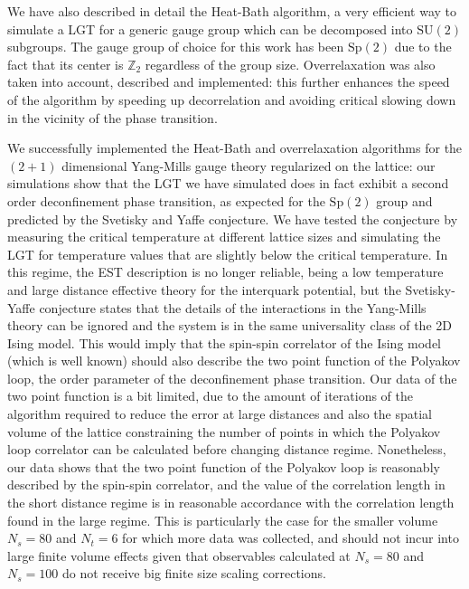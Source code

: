 \documentclass[reqno,12pt]{article}
\numberwithin{equation}{section}
\newcommand{\SU}{\mathrm{SU}}
\newcommand{\Sp}{\mathrm{Sp}}
\begin{document}
We have also described in detail the Heat-Bath algorithm, a very efficient way to simulate a LGT for a generic gauge
group which can be decomposed into $\SU(2)$ subgroups. The gauge group of choice for this work has been $\Sp(2)$ due to the 
fact that its center is $\mathbb{Z}_2$ regardless of the group size. Overrelaxation was also taken into account, described
and implemented: this further enhances the speed of the algorithm by speeding up decorrelation and avoiding critical 
slowing down in the vicinity of the phase transition. 

We successfully implemented the Heat-Bath and overrelaxation algorithms for the $(2+1)$ dimensional
Yang-Mills gauge theory regularized on the lattice: our simulations show that the LGT we have simulated
does in fact exhibit a second order deconfinement phase transition, as expected for the $\Sp(2)$ group and predicted by
the Svetisky and Yaffe conjecture. We have tested the conjecture by measuring the critical temperature at different lattice
sizes and simulating the LGT for temperature values that are slightly below the critical temperature. In this regime,
the EST description is no longer reliable, being a low temperature and large distance effective theory for the interquark
potential, but the Svetisky-Yaffe conjecture states that the details of the
interactions in the Yang-Mills theory can be ignored and the system is in the same universality class of the 2D Ising model.
This would imply that the spin-spin correlator of the Ising model (which is well known) should also describe the 
two point function of the Polyakov loop, the order parameter of the deconfinement phase transition. Our data of the two point
function is a bit limited, due to the amount of iterations of the algorithm required to reduce the error at large distances
and also the spatial volume of the lattice constraining the number of points in which the Polyakov loop correlator can be
calculated before changing distance regime. Nonetheless, our data shows that the two point function of the Polyakov loop
is reasonably described by the spin-spin correlator, and the value of the correlation length in the short distance regime
is in reasonable accordance with the correlation length found in the large regime. This is particularly the case for
the smaller volume $N_s = 80$ and $N_t = 6$ for which more data was collected, and should not incur into large 
finite volume effects given that observables calculated at $N_s = 80$ and $N_s = 100$ do not receive big finite size
scaling corrections. 
\end{document}
